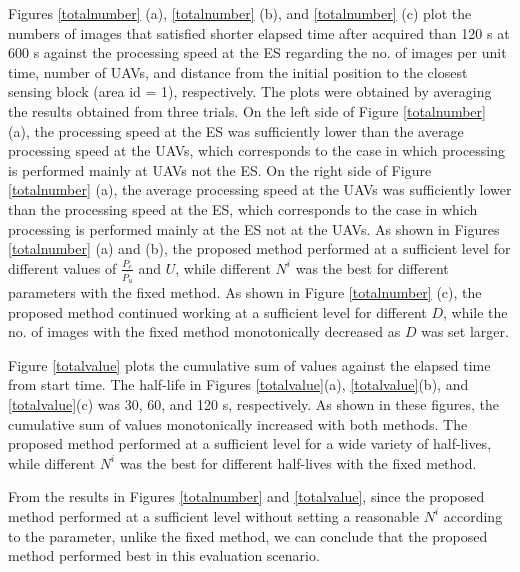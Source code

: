 \documentclass{ieeeaccess}
\begin{document}
Figures \ref{totalnumber} (a), \ref{totalnumber} (b), and \ref{totalnumber} (c) plot the numbers of images that satisfied shorter elapsed time after acquired than 120 s at 600 s against the processing speed at the ES regarding the no. of images per unit time, number of UAVs, and distance from the initial position to the closest sensing block (area id = 1), respectively. The plots were obtained by averaging the results obtained from three trials. On the left side of Figure \ref{totalnumber} (a), the processing speed at the ES was sufficiently lower than the average processing speed at the UAVs, which corresponds to the case in which processing is performed mainly at UAVs not the ES. On the right side of Figure \ref{totalnumber} (a), the average processing speed at the UAVs was sufficiently lower than the processing speed at the ES, which corresponds to the case in which processing is performed mainly at the ES not at the UAVs. As shown in Figures \ref{totalnumber} (a) and (b), the proposed method performed at a sufficient level for different values of $\frac{P_e}{\overline{P_u}}$ and $U$, while different $N^i$ was the best for different parameters with the fixed method. As shown in Figure \ref{totalnumber} (c), the proposed method continued working at a sufficient level for different $D$, while the no. of images with the fixed method monotonically decreased as $D$ was set larger.

Figure \ref{totalvalue} plots the cumulative sum of values against the elapsed time from start time. The half-life in Figures \ref{totalvalue}(a), \ref{totalvalue}(b), and \ref{totalvalue}(c) was 30, 60, and 120 s, respectively. As shown in these figures, the cumulative sum of values monotonically increased with both methods. The proposed method performed at a sufficient level for a wide variety of half-lives, while different $N^i$ was the best for different half-lives with the fixed method.

From the results in Figures \ref{totalnumber} and \ref{totalvalue}, since the proposed method performed at a sufficient level without setting a reasonable $N^i$ according to the parameter, unlike the fixed method, we can conclude that the proposed method performed best in this evaluation scenario.
\end{document}

